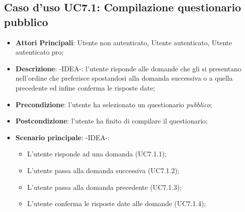 \subsection{Caso d'uso UC7.1: Compilazione questionario pubblico}
\begin{itemize}
\item\textbf{Attori Principali}: Utente non autenticato, Utente autenticato, Utente autenticato pro;
\item\textbf{Descrizione}: -IDEA-: l'utente risponde alle domande che gli si presentano nell'ordine che preferisce spostandosi alla domanda successiva o a quella precedente ed infine conferma le risposte date;
\item\textbf{Precondizione}: l'utente ha selezionato un questionario \textit{pubblico};
\item\textbf{Postcondizione}: l'utente ha finito di compilare il questionario;
\item\textbf{Scenario principale}: -IDEA-:
\begin{itemize}
\item L'utente risponde ad una domanda (UC7.1.1);
\item L'utente passa alla domanda successiva (UC7.1.2);
\item L'utente passa alla domanda precedente (UC7.1.3);
\item L'utente conferma le risposte date alle domande (UC7.1.4);
\end{itemize}
\end{itemize}

